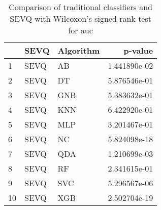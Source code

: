 \begin{table}[H]
\footnotesize
\centering
\caption{Comparison of traditional classifiers and SEVQ with Wilcoxon’s signed-rank test for auc}
\label{tab:Traditional wilcoxon AUC comparison}
\begin{tabular}{lllr}
\hline
{} &  SEVQ & Algorithm &       p-value \\
\hline
1  &  SEVQ &        AB &  1.441890e-02 \\
2  &  SEVQ &        DT &  5.876546e-01 \\
3  &  SEVQ &       GNB &  5.383632e-01 \\
4  &  SEVQ &       KNN &  6.422920e-01 \\
5  &  SEVQ &       MLP &  3.201467e-01 \\
6  &  SEVQ &        NC &  5.824098e-18 \\
7  &  SEVQ &       QDA &  1.210699e-03 \\
8  &  SEVQ &        RF &  2.341615e-01 \\
9  &  SEVQ &       SVC &  5.296567e-06 \\
10 &  SEVQ &       XGB &  2.502704e-19 \\
\hline
\end{tabular}
\end{table}
